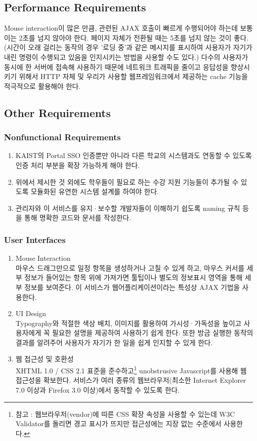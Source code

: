 \documentclass[a4paper,titlepage]{article}
\begin{document}
\subsection{Performance Requirements}
Mouse interaction이 많은 만큼, 관련된 AJAX 호출이 빠르게 수행되어야 하는데 보통 이는 2초를 넘지 않아야 한다.
페이지 자체가 전환될 때는 5초를 넘지 않는 것이 좋다.
(시간이 오래 걸리는 동작의 경우 '로딩 중'과 같은 메시지를 표시하여 사용자가 자기가 내린 명령이 수행되고 있음을 인지시키는 방법을 사용할 수도 있다.)
다수의 사용자가 동시에 한 서버에 접속해 사용하기 때문에 네트워크 트래픽을 줄이고 응답성을 향상시키기 위해서 HTTP 자체 및 우리가 사용할 웹프레임워크에서 제공하는 cache 기능을 적극적으로 활용해야 한다.

\subsection{Other Requirements}
\subsubsection{Nonfunctional Requirements}
\begin{enumerate}
	\item KAIST의 Portal SSO 인증뿐만 아니라 다른 학교의 시스템과도 연동할 수 있도록 인증 처리 부분을 확장 가능하게 해야 한다.
	\item 위에서 제시한 것 외에도 학우들이 필요로 하는 수강 지원 기능들이 추가될 수 있도록 모듈화된 유연한 시스템 설계를 하여야 한다.
	\item 관리자와 이 서비스를 유지·보수할 개발자들이 이해하기 쉽도록 naming 규칙 등을 통해 명확한 코드와 문서를 작성한다.
\end{enumerate}
\subsubsection{User Interfaces}
\begin{enumerate}
	\item Mouse Interaction\\
	마우스 드래그만으로 일정 항목을 생성하거나 고칠 수 있게 하고, 마우스 커서를 세부 정보가 들어있는 항목 위에 가져가면 툴팁이나 별도의 정보표시 영역을 통해 세부 정보를 보여준다.
	이 서비스가 웹어플리케이션이라는 특성상 AJAX 기법을 사용한다. 
	\item UI Design\\
	Typography와 적절한 색상 배치, 이미지를 활용하여 가시성·가독성을 높이고 사용자에게 꼭 필요한 설명을 제공하여 사용하기 쉽게 한다.
	또한 방금 실행한 동작의 결과를 알려주어 사용자가 자기가 한 일을 쉽게 인지할 수 있게 한다.
	\item 웹 접근성 및 호환성\\
	XHTML 1.0 / CSS 2.1 표준을 준수하고\footnote{참고 : 웹브라우저(vendor)에 따른 CSS 확장 속성을 사용할 수 있는데 W3C Validator를 돌리면 경고 표시가 뜨지만 접근성에는 지장 없는 수준에서 사용한다.} unobstrusive Javascript를 사용해 웹 접근성을 확보한다.
	서비스가 여러 종류의 웹브라우저(최소한 Internet Explorer 7.0 이상과 Firefox 3.0 이상)에서 동작할 수 있도록 한다. 
\end{enumerate}
\end{document}
